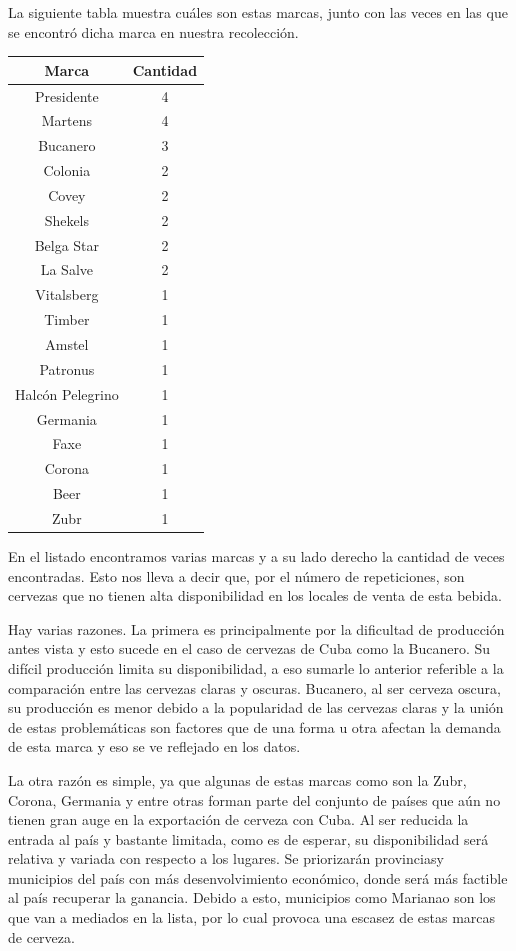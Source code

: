 \documentclass[a4paper,12pt]{article}
\begin{document}
La siguiente tabla muestra cuáles son estas marcas, junto con las veces en las que se encontró dicha marca en nuestra recolección.
\begin{center}
    \begin{tabular}{|c|c|}
    \hline
    Marca & Cantidad\\
    \hline
    Presidente & 4\\
    \hline
    Martens & 4\\
    \hline
    Bucanero & 3\\
    \hline
    Colonia & 2\\
    \hline
    Covey & 2\\
    \hline
    Shekels & 2\\
    \hline
    Belga Star & 2\\
    \hline
    La Salve & 2\\
    \hline
    Vitalsberg & 1\\
    \hline
    Timber & 1\\
    \hline
    Amstel & 1\\
    \hline
    Patronus & 1\\
    \hline
    Halcón Pelegrino & 1\\
    \hline
    Germania & 1\\
    \hline
    Faxe & 1\\
    \hline
    Corona & 1\\
    \hline
    Beer & 1\\
    \hline
    Zubr & 1\\
    \hline
    \end{tabular}
\end{center}
En el listado encontramos varias marcas y a su lado derecho la cantidad de veces encontradas. 
Esto nos lleva a decir que, por el número de repeticiones, son cervezas que no tienen alta disponibilidad en los locales de venta de esta bebida.

Hay varias razones. 
La primera es principalmente por la dificultad de producción antes vista y esto sucede en el caso de cervezas de Cuba como la Bucanero. 
Su difícil producción limita su disponibilidad, a eso sumarle lo anterior referible a la comparación entre las cervezas claras y oscuras. 
Bucanero, al ser cerveza oscura, su producción es menor debido a la popularidad de las cervezas claras y la unión de estas problemáticas son factores que de una forma u otra afectan la demanda de esta marca y eso se ve reflejado en los datos.

La otra razón es simple, ya que algunas de estas marcas como son la Zubr, Corona, Germania y entre otras forman parte del conjunto de países que aún no tienen gran auge en la exportación de cerveza con Cuba. 
Al ser reducida la entrada al país y bastante limitada, como es de esperar, su disponibilidad será relativa y variada con respecto a los lugares. 
Se priorizarán provinciasy municipios del país con más desenvolvimiento económico, donde será más factible al país recuperar la ganancia. 
Debido a esto, municipios como Marianao son los que van a mediados en la lista, por lo cual provoca una escasez de estas marcas de cerveza.
\end{document}
